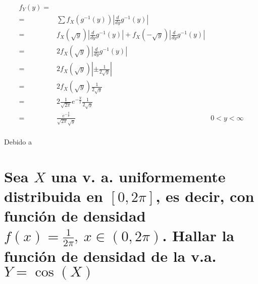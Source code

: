 \documentclass{article}
\begin{document}
    \begin{align}
      f_Y (y) =& &\\
              =& \sum f_X \left( g^{-1} (y) \right) \left| \frac{d}{dy} g^{-1} (y) \right| &\\
              =& f_X \left( \sqrt{y} \right) \left| \frac{d}{dy} g^{-1} (y) \right| + f_X \left( - \sqrt{y} \right) \left| \frac{d}{dy} g^{-1} (y) \right| &\\
              =& 2f_X \left( \sqrt{y} \right) \left| \frac{d}{dy} g^{-1} (y) \right| &\\
              =& 2f_X \left( \sqrt{y} \right) \left| \pm \frac{1}{2\sqrt{y}} \right| &\\
              =& 2f_X \left( \sqrt{y} \right) \frac{1}{2\sqrt{y}} &\\
              =& 2\frac{1}{\sqrt{2\pi} } e^{-\frac{y}{2}} \frac{1}{2\sqrt{y}}  & \\
              =& \frac{e^{-\frac{y}{2}}}{ \sqrt{2\pi} \sqrt{y} } & 0<y<\infty
    \end{align}

    \begin{figure}
      \center
      \caption{}
      \label{}
    \end{figure}

    \paragraph{}
    Debido a

  \section{Sea $X$ una v. a. uniformemente distribuida en $[0,2\pi]$, es decir, con función de densidad $f(x)=\frac{1}{2\pi}, \ x \in (0,2\pi)$. Hallar la función de densidad de la v.a. $Y = \cos(X)$}
\end{document}
